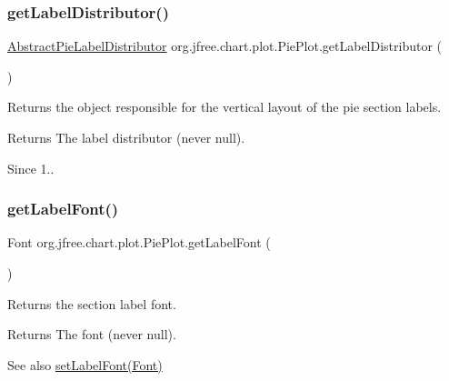 \subsubsection{\texorpdfstring{get\+Label\+Distributor()}{getLabelDistributor()}}
{\footnotesize\ttfamily \mbox{\hyperlink{classorg_1_1jfree_1_1chart_1_1plot_1_1_abstract_pie_label_distributor}{Abstract\+Pie\+Label\+Distributor}} org.\+jfree.\+chart.\+plot.\+Pie\+Plot.\+get\+Label\+Distributor (\begin{DoxyParamCaption}{ }\end{DoxyParamCaption})}

Returns the object responsible for the vertical layout of the pie section labels.

\begin{DoxyReturn}{Returns}
The label distributor (never {\ttfamily null}).
\end{DoxyReturn}
\begin{DoxySince}{Since}
1.. 
\end{DoxySince}
\mbox{\label{classorg_1_1jfree_1_1chart_1_1plot_1_1_pie_plot_aac6ac1fe8df03ac408f23890be3322e8}} 
\subsubsection{\texorpdfstring{get\+Label\+Font()}{getLabelFont()}}
{\footnotesize\ttfamily Font org.\+jfree.\+chart.\+plot.\+Pie\+Plot.\+get\+Label\+Font (\begin{DoxyParamCaption}{ }\end{DoxyParamCaption})}

Returns the section label font.

\begin{DoxyReturn}{Returns}
The font (never {\ttfamily null}).
\end{DoxyReturn}
\begin{DoxySeeAlso}{See also}
\mbox{\hyperlink{classorg_1_1jfree_1_1chart_1_1plot_1_1_pie_plot_a8c2f0cd7aa743c883a2903d2f46c8e23}{set\+Label\+Font(\+Font)}} 
\end{DoxySeeAlso}
\mbox{\label{classorg_1_1jfree_1_1chart_1_1plot_1_1_pie_plot_a7c95a8a80e5f60f48f991a482bf67733}} 
